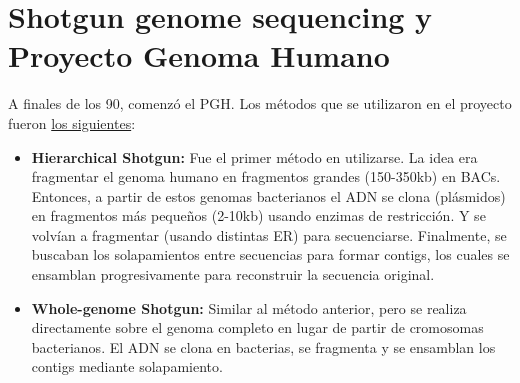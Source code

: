 \section{Shotgun genome sequencing y Proyecto Genoma Humano}
A finales de los 90, comenzó el PGH. Los métodos que se utilizaron en el proyecto fueron \href{https://www.youtube.com/watch?v=aShY577MoM0}{los siguientes}:
\begin{itemize}
\item \textbf{Hierarchical Shotgun:} Fue el primer método en utilizarse. La idea era fragmentar el genoma humano en fragmentos grandes (150-350kb) en BACs. Entonces, a partir de estos genomas bacterianos el ADN se clona (plásmidos) en fragmentos más pequeños (2-10kb) usando enzimas de restricción. Y se volvían a fragmentar (usando distintas ER) para secuenciarse. Finalmente, se buscaban los solapamientos entre secuencias para formar contigs, los cuales se ensamblan progresivamente para reconstruir la secuencia original. 
\item \textbf{Whole-genome Shotgun:} Similar al método anterior, pero se realiza directamente sobre el genoma completo en lugar de partir de cromosomas bacterianos. El ADN se clona en bacterias, se fragmenta y se ensamblan los contigs mediante solapamiento.
\end{itemize}

